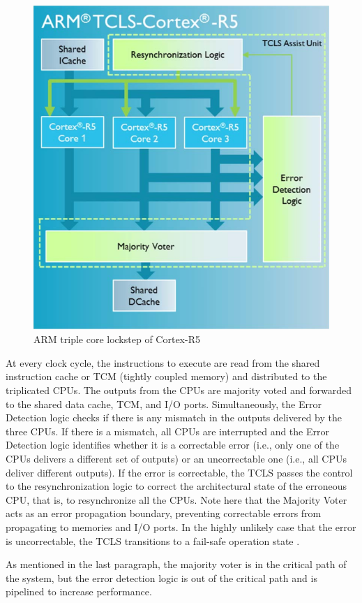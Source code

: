 \begin{figure}[H]

      \centering
      \includegraphics[width=0.7\linewidth]{images/tcls_architecture.png}
      \caption{ARM triple core lockstep of Cortex-R5 \citep{TCLS_cortex_r}}
      \label{fig:tcls_architecture}
    
\end{figure}

At every clock cycle, the instructions to execute are read
from the shared instruction cache or TCM (tightly coupled memory) and distributed to
the triplicated CPUs. The outputs from the CPUs are majority voted and
forwarded to the shared data cache, TCM, and I/O ports.
Simultaneously, the Error Detection logic checks if there is any
mismatch in the outputs delivered by the three CPUs. If there is
a mismatch, all CPUs are interrupted and the Error Detection
logic identifies whether it is a correctable error (i.e., only one
of the CPUs delivers a different set of outputs) or an
uncorrectable one (i.e., all CPUs deliver different outputs). If
the error is correctable, the TCLS passes the control to the
resynchronization logic to correct the architectural state of the
erroneous CPU, that is, to resynchronize all the CPUs. Note
here that the Majority Voter acts as an error propagation
boundary, preventing correctable errors from propagating to
memories and I/O ports. In the highly unlikely case that the
error is uncorrectable, the TCLS transitions to a fail-safe
operation state \citep{TCLS_cortex_r}.

As mentioned in the last paragraph, the majority voter is in the critical path of the system, but the error detection logic is out of the critical path and is pipelined to increase performance.

